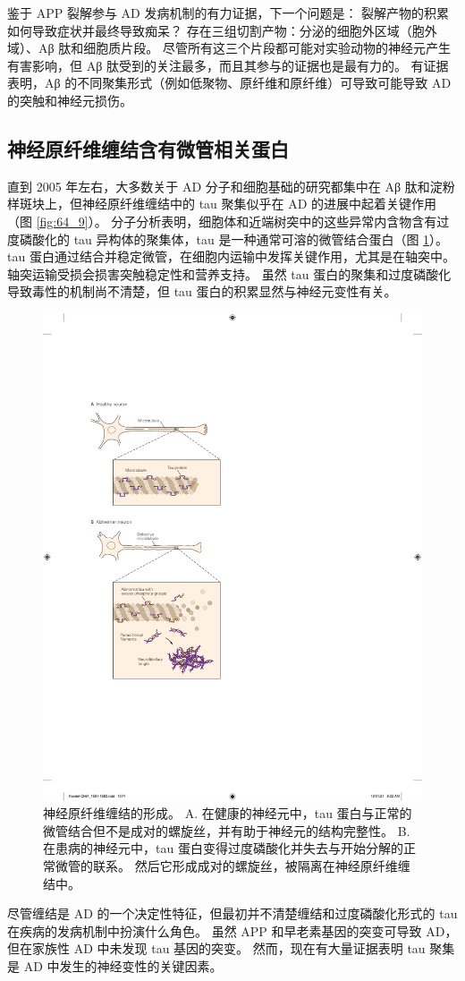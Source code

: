 鉴于 APP 裂解参与 AD 发病机制的有力证据，下一个问题是：
裂解产物的积累如何导致症状并最终导致痴呆？ 存在三组切割产物：分泌的细胞外区域（胞外域）、Aβ 肽和细胞质片段。
尽管所有这三个片段都可能对实验动物的神经元产生有害影响，但 Aβ 肽受到的关注最多，而且其参与的证据也是最有力的。
有证据表明，Aβ 的不同聚集形式（例如低聚物、原纤维和原纤维）可导致可能导致 AD 的突触和神经元损伤。



\subsection{神经原纤维缠结含有微管相关蛋白}
直到 2005 年左右，大多数关于 AD 分子和细胞基础的研究都集中在 Aβ 肽和淀粉样斑块上，但神经原纤维缠结中的 tau 聚集似乎在 AD 的进展中起着关键作用（图 \ref{fig:64_9}）。
分子分析表明，细胞体和近端树突中的这些异常内含物含有过度磷酸化的 tau 异构体的聚集体，tau 是一种通常可溶的微管结合蛋白（图 \ref{fig:64_13}）。
tau 蛋白通过结合并稳定微管，在细胞内运输中发挥关键作用，尤其是在轴突中。
轴突运输受损会损害突触稳定性和营养支持。
虽然 tau 蛋白的聚集和过度磷酸化导致毒性的机制尚不清楚，但 tau 蛋白的积累显然与神经元变性有关。


\begin{figure}[htbp]
	\centering
	\includegraphics[width=0.5\linewidth]{chap64/fig_64_13}
	\caption{神经原纤维缠结的形成。 A. 在健康的神经元中，tau 蛋白与正常的微管结合但不是成对的螺旋丝，并有助于神经元的结构完整性。 B. 在患病的神经元中，tau 蛋白变得过度磷酸化并失去与开始分解的正常微管的联系。 然后它形成成对的螺旋丝，被隔离在神经原纤维缠结中。}
	\label{fig:64_13}
\end{figure}


尽管缠结是 AD 的一个决定性特征，但最初并不清楚缠结和过度磷酸化形式的 tau 在疾病的发病机制中扮演什么角色。
虽然 APP 和早老素基因的突变可导致 AD，但在家族性 AD 中未发现 tau 基因的突变。
然而，现在有大量证据表明 tau 聚集是 AD 中发生的神经变性的关键因素。


